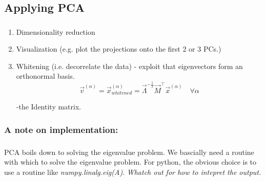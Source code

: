 \subsection{Applying PCA}



\begin{frame}\frametitle{\subsecname}

\begin{enumerate}
\item Dimensionality reduction
\item Visualization (e.g. plot the projections onto the first 2 or 3 PCs.)
\item Whitening (i.e. decorrelate the data) - exploit that eigenvectors form an orthonormal basis.
$$
\vec v^{(\alpha)} = \vec x_{whitened}^{(\alpha)} = \vec{\Lambda}^{-\frac{1}{2}}\vec{M}^\top\vec{x}^{(\alpha)}
\quad
\forall \alpha
$$


\pause

-the Identity matrix.

\end{enumerate}

\end{frame}

\newpage


\subsubsection{A note on implementation:}

\begin{frame}\frametitle{\subsubsecname}


PCA boils down to solving the eigenvalue problem.
We bascially need a routine with which to solve the eigenvalue problem. For python, the obvious choice is to use a routine like \textit{numpy.linalg.eig(A)}. \emph{Whatch out for how to intepret the output.}

\end{frame}

